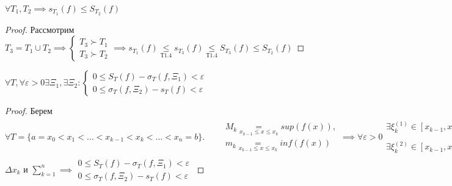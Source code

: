 \documentclass[../main.tex]{subfiles}
\begin{document}
\begin{theorem}
    $\forall T_{1},T_{2}\implies s_{T_{1}}(f)\leqslant S_{T_{2}}(f)$
\end{theorem}
\begin{proof}
    Рассмотрим $T_{3}=T_{1} \cup T_{2} \implies \begin{cases}
        T_{3}\succ T_{1} \\
        T_{3}\succ T_{2}
    \end{cases}\implies s_{T_{1}}(f)\underset{\text{Т1.4}}{\leqslant} s_{T_{3}}(f)\underset{\text{Т1.4}}{\leqslant} S_{T_{3}}(f)\leqslant S_{T_{2}}(f)$
\end{proof}
\begin{theorem}
    $ \forall T, \forall \varepsilon>0 \exists \Xi_{1},\exists \Xi_{2}:\begin{cases}
        0\leqslant S_{T}(f)-\sigma_{T}(f,\Xi_{1})<\varepsilon \\ 
        0\leqslant \sigma_{T}(f,\Xi_{2})-s_{T}(f)<\varepsilon
    \end{cases}$
\end{theorem}
\begin{proof}
    Берем $ \forall T =\{a=x_{0}<x_{1}<\dots<x_{k-1}<x_{k}<\dots<x_{n}=b\}. \qquad \begin{aligned}M_{k}\underset{x_{k-1}\leqslant x\leqslant x_{k}}{=}sup(f(x)),\\m_{k}\underset{x_{k-1}\leqslant x\leqslant x_{k}}{=}inf(f(x)) \end{aligned}
    \implies \forall \varepsilon > 0 \begin{aligned}\exists \xi_{k}^{(1)}\in [x_{k-1},x_{k}]: 0\leqslant M_{k}-f(\xi_{k}^{(1)})<\frac{\varepsilon}{b-a}\\ 
    \exists \xi_{k}^{(2)}\in [x_{k-1},x_{k}]:0\leqslant f(\xi_{k}^{(2)})-m_{k}<\frac{\varepsilon}{b-a}\end{aligned}$
    $ \Delta x_{k}$ и $\sum_{k=1}^{n}\implies \begin{aligned}
        0\leqslant S_{T}(f)-\sigma_{T}(f,\Xi_{1})<\varepsilon\\
        0\leqslant \sigma_{T}(f,\Xi_{2})-s_{T}(f)<\varepsilon
    \end{aligned}$
\end{proof}
\end{document}
